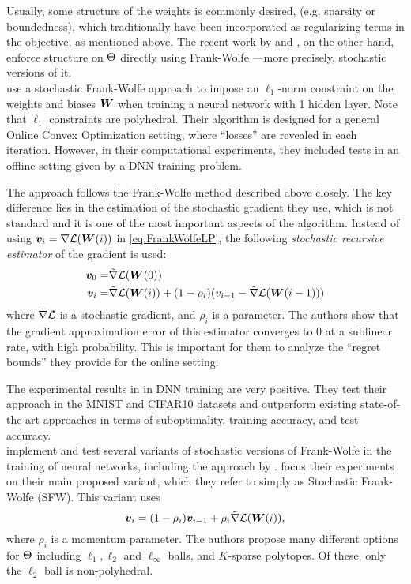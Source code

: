 Usually, some structure of the weights is commonly desired, (e.g. sparsity or boundedness), which traditionally have been incorporated as regularizing terms in the objective, as mentioned above.
%
The recent work by \cite{xie2020efficient} and \cite{pokutta2020deep}, on the other hand, enforce structure on $\Theta$ directly using Frank-Wolfe ---more precisely, stochastic versions of it.\\

\cite{xie2020efficient} use a stochastic Frank-Wolfe approach to impose an $\ell_1$-norm constraint on the weights and biases ${\bm{W}}$ when training a neural network with 1 hidden layer. Note that $\ell_1$ constraints are polyhedral.
 Their algorithm is designed for a general Online Convex Optimization setting, where ``losses'' are revealed in each iteration. However, in their computational experiments, they included tests in an offline setting given by a DNN training problem. 
 
 The approach follows the Frank-Wolfe method described above closely. The key difference lies in the estimation of the stochastic gradient they use, which is not standard and it is one of the most important aspects of the algorithm. Instead of using ${\bm{v}}_i = \nabla \mathcal{L}({\bm{W}}(i))$ in \eqref{eq:FrankWolfeLP}, the following \emph{stochastic recursive estimator} of the gradient is used:
 \begin{align*}
 {\bm{v}}_0 =& \tilde{\nabla}\mathcal{L}({\bm{W}}(0)) \\
 {\bm{v}}_i =& \tilde{\nabla}\mathcal{L}({\bm{W}}(i)) + (1-\rho_i)(v_{i-1} - \tilde{\nabla}\mathcal{L}({\bm{W}}(i-1)))
 \end{align*}
 where $\tilde{\nabla}\mathcal{L}$ is a stochastic gradient, and $\rho_i$ is a parameter. The authors show that the gradient approximation error of this estimator converges to 0 at a sublinear rate, with high probability. This is important for them to analyze the ``regret bounds'' they provide for the online setting.

The experimental results in \cite{xie2020efficient} in DNN training are very positive. They test their approach in the MNIST and CIFAR10 datasets and outperform existing state-of-the-art approaches in terms of suboptimality, training accuracy, and test accuracy.\\


\cite{pokutta2020deep} implement and test several variants of stochastic versions of Frank-Wolfe in the training of neural networks, including the approach by \cite{xie2020efficient}. \cite{pokutta2020deep} focus their experiments on their main proposed variant, which they refer to simply as Stochastic Frank-Wolfe (SFW). This variant uses
%
\[{\bm{v}}_i = (1-\rho_i){\bm{v}}_{i-1} + \rho_i \tilde{\nabla}\mathcal{L}({\bm{W}}(i)),\]
%
where $\rho_i$ is a momentum parameter. The authors propose many different options for $\Theta$ including $\ell_1, \ell_2$ and $\ell_\infty$ balls, and $K$-sparse polytopes. Of these, only the $\ell_2$ ball is non-polyhedral.

